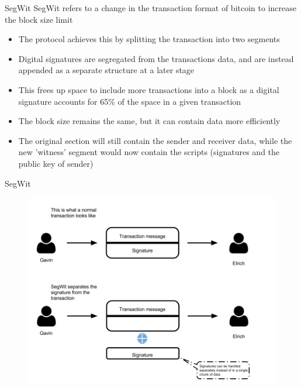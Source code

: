 \documentclass[9pt]{beamer}
\begin{document}
\begin{frame}{SegWit}
	SegWit refers to a change in the transaction format of bitcoin to increase the block size limit
	\begin{itemize}
		\item The protocol achieves this by splitting the transaction into two segments
		\item Digital signatures are segregated from the transactions data, and are instead appended as a separate structure at a later stage
		\item This frees up space to include more transactions into a block as a digital signature accounts for 65\% of the space in a given transaction
		\item The block size remains the same, but it can contain data more efficiently
		\item The original section will still contain the sender and receiver data, while the new 'witness' segment would now contain the scripts (signatures and the public key of sender)
	\end{itemize}
\end{frame}


\begin{frame}{SegWit}
	\begin{figure}[]
		\centering
		\includegraphics  [scale=0.3]{Images/segwit1}
	\end{figure}
\end{frame}

\end{document}
